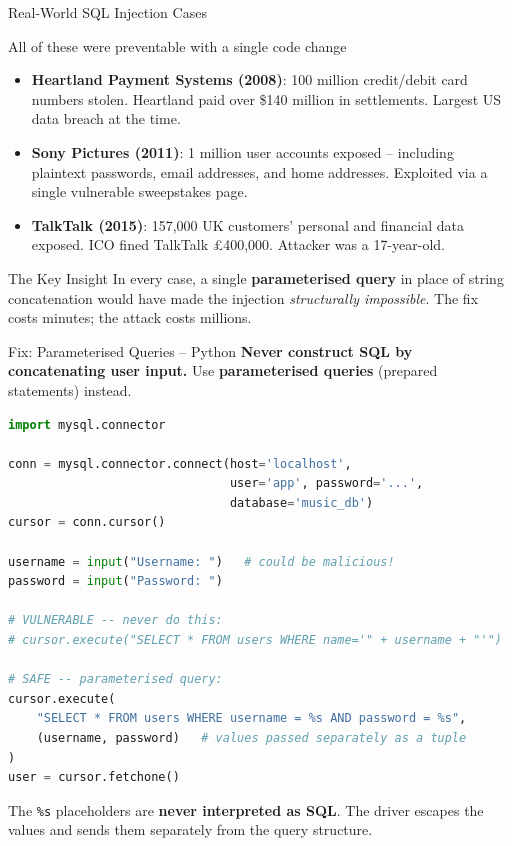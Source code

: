 \begin{frame}{Real-World SQL Injection Cases}
  \begin{alertblock}{All of these were preventable with a single code change}
    \begin{itemize}
      \item \textbf{Heartland Payment Systems (2008)}: 100 million credit/debit card numbers stolen.
            Heartland paid over \$140 million in settlements. Largest US data breach at the time.
      \item \textbf{Sony Pictures (2011)}: 1 million user accounts exposed -- including plaintext
            passwords, email addresses, and home addresses. Exploited via a single vulnerable
            sweepstakes page.
      \item \textbf{TalkTalk (2015)}: 157,000 UK customers' personal and financial data exposed.
            ICO fined TalkTalk \pounds 400,000. Attacker was a 17-year-old.
    \end{itemize}
  \end{alertblock}

  \begin{block}{The Key Insight}
    In every case, a single \textbf{parameterised query} in place of string concatenation would
    have made the injection \emph{structurally impossible}.
    The fix costs minutes; the attack costs millions.
  \end{block}
\end{frame}

\begin{frame}[fragile]{Fix: Parameterised Queries -- Python}
  \textbf{Never construct SQL by concatenating user input.}
  Use \textbf{parameterised queries} (prepared statements) instead.

  \begin{lstlisting}[style=sqlstyle, language=Python]
import mysql.connector

conn = mysql.connector.connect(host='localhost',
                               user='app', password='...',
                               database='music_db')
cursor = conn.cursor()

username = input("Username: ")   # could be malicious!
password = input("Password: ")

# VULNERABLE -- never do this:
# cursor.execute("SELECT * FROM users WHERE name='" + username + "'")

# SAFE -- parameterised query:
cursor.execute(
    "SELECT * FROM users WHERE username = %s AND password = %s",
    (username, password)   # values passed separately as a tuple
)
user = cursor.fetchone()
  \end{lstlisting}

  The \texttt{\%s} placeholders are \textbf{never interpreted as SQL}.
  The driver escapes the values and sends them separately from the query structure.
\end{frame}

